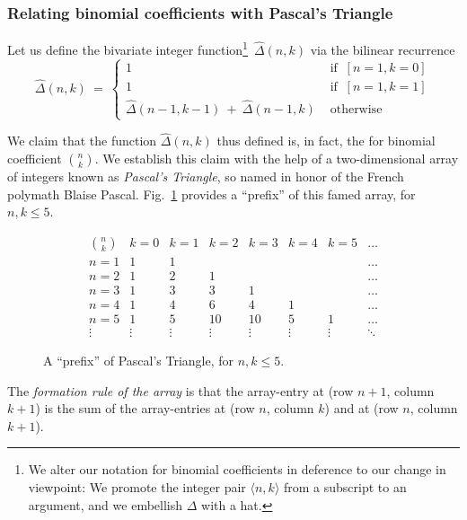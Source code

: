 \subsubsection{Relating binomial coefficients with Pascal's Triangle}

Let us define the bivariate integer function\footnote{We alter our
  notation for binomial coefficients in deference to our change in
  viewpoint: We promote the integer pair $\langle n,k \rangle$ from a
  subscript to an argument, and we embellish $\Delta$ with a
  hat.}~$\hat{\Delta}(n,k)$ via the bilinear recurrence
\begin{equation}
\label{eq:binom-coeff-recurrence}
\hat{\Delta}(n,k) \ = \ 
\left\{
\begin{array}{cl}
1  & \mbox{ if } \ [n=1, k=0] \\
1  & \mbox{ if } \ [n=1, k=1] \\
\hat{\Delta}(n-1, k-1) \ + \  \hat{\Delta}(n-1,k) & \mbox{ otherwise}
\end{array}
\right.
\end{equation}

\smallskip

We claim that the function $\hat{\Delta}(n,k)$ thus defined is, in
fact, the for binomial coefficient $\displaystyle {n \choose k}$.  We
establish this claim with the help of a two-dimensional array of
integers known as {\it Pascal's Triangle},
so named in honor of the French polymath Blaise Pascal.
Fig.~\ref{fig:pascal-triangle} provides a ``prefix'' of this famed
array, for $n,k \leq 5$.
\begin{figure}[htb]
\[
\begin{array}{c||r|r|r|r|r|r|r}
{\displaystyle {n \choose k}} & k=0 & k=1 & k=2 & k=3 & k=4 & k=5 &\ldots \\
\hline
\hline
n=1 & 1 & 1 &    &    &    &   & \ldots \\
\hline
n=2 & 1 & 2 & 1  &    &    &   & \ldots \\
\hline
n=3 & 1 & 3 & 3  & 1  &    &   & \ldots \\
\hline
n=4 & 1 & 4 & 6  & 4  & 1  &   & \ldots \\
\hline
n=5 & 1 & 5 & 10 & 10 & 5  & 1 & \ldots \\
\hline
\vdots &\vdots &\vdots &\vdots &\vdots &\vdots &\vdots &\ddots
\end{array}
\]
\caption{A ``prefix'' of Pascal's Triangle, for $n,k \leq 5$.}
\label{fig:pascal-triangle}
\end{figure}
The {\em formation rule of the array} is that the array-entry at (row
$n+1$, column $k+1$) is the sum of the array-entries at (row $n$, column
$k$) and at (row $n$, column $k+1$).


